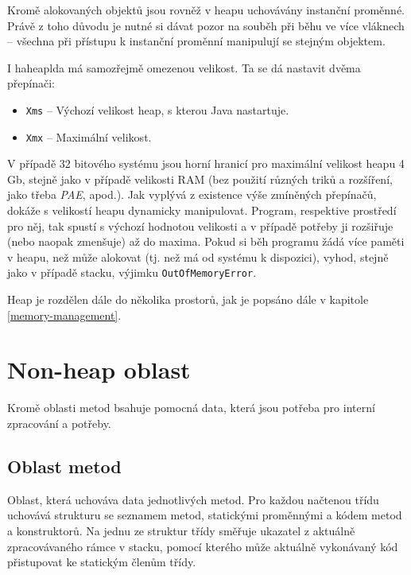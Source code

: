 Kromě alokovaných objektů jsou rovněž v heapu uchovávány instanční proměnné. Právě z toho důvodu je nutné si dávat pozor na souběh při běhu ve více vláknech --  všechna při přístupu k instanční proměnní manipulují se stejným objektem.

I haheaplda má samozřejmě omezenou velikost. Ta se dá nastavit dvěma přepínači:

\begin{itemize}
	\item \texttt{Xms} -- Výchozí velikost heap, s kterou Java nastartuje.
	\item \texttt{Xmx} -- Maximální velikost.
\end{itemize}

V případě 32 bitového systému jsou horní hranicí pro maximální velikost heapu 4 Gb, stejně jako v případě velikosti RAM (bez použití různých triků a rozšíření, jako třeba \textit{PAE}, apod.). Jak vyplývá z existence výše zmíněných přepínačů,  dokáže s velikostí heapu dynamicky manipulovat. Program, respektive prostředí pro něj, tak spustí s výchozí hodnotou velikosti a v případě potřeby ji rozšiřuje (nebo naopak zmenšuje) až do maxima. Pokud si běh programu žádá více paměti v heapu, než může  alokovat (tj. než má od systému k dispozici), vyhod, stejně jako v případě stacku, výjimku \texttt{OutOfMemoryError}. 

Heap je rozdělen dále do několika prostorů, jak je popsáno dále v kapitole \ref{memory-management}.

\section{Non-heap oblast}
Kromě oblasti metod bsahuje pomocná data, která jsou potřeba pro interní zpracování a potřeby. 
\subsection{Oblast metod}
Oblast, která uchováva data jednotlivých metod. Pro každou načtenou třídu uchovává strukturu se seznamem metod, statickými proměnnými a kódem metod a konstruktorů. Na jednu ze struktur třídy směřuje ukazatel z aktuálně zpracovávaného rámce v stacku, pomocí kterého může aktuálně vykonávaný kód přistupovat ke statickým členům třídy.

